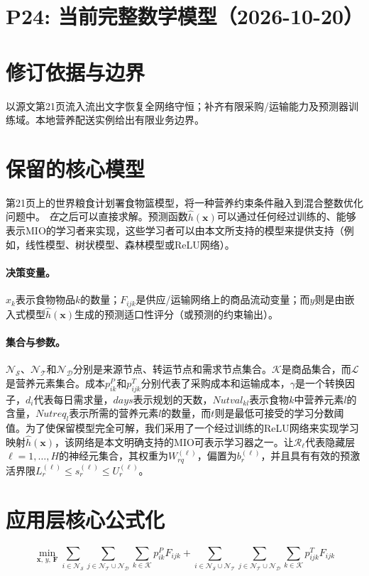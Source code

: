 \documentclass[11pt]{ctexart}
\begin{document}
\section*{P24: 当前完整数学模型（2026-10-20）}
\section*{修订依据与边界}以源文第21页流入流出文字恢复全网络守恒；补齐有限采购/运输能力及预测器训练域。本地营养配送实例给出有限业务边界。




\section*{保留的核心模型}
第21页上的世界粮食计划署食物篮模型，将一种营养约束条件融入到混合整数优化问题中。 \emph{在}之后可以直接求解。预测函数$\hat h(\boldsymbol{x})$可以通过任何经过训练的、能够表示MIO的学习者来实现，这些学习者可以由本文所支持的模型来提供支持（例如，线性模型、树状模型、森林模型或ReLU网络）。

\paragraph{决策变量。}
$x_k$表示食物物品$k$的数量；$F_{ijk}$是供应/运输网络上的商品流动变量；而$y$则是由嵌入式模型$\hat h(\boldsymbol{x})$生成的预测适口性评分（或预测的约束输出）。

\paragraph{集合与参数。}
$\mathcal N_{\mathcal S}$、$\mathcal N_{\mathcal T}$和$\mathcal N_{\mathcal D}$分别是来源节点、转运节点和需求节点集合。$\mathcal K$是商品集合，而$\mathcal L$是营养元素集合。成本$p_{ik}^P$和$p_{ijk}^T$分别代表了采购成本和运输成本，$\gamma$是一个转换因子，$d_i$代表每日需求量，$days$表示规划的天数，$Nutval_{kl}$表示食物$k$中营养元素$l$的含量，$Nutreq_l$表示所需的营养元素$l$的数量，而$t$则是最低可接受的学习分数阈值。为了使保留模型完全可解，我们采用了一个经过训练的ReLU网络来实现学习映射$\hat h(\boldsymbol{x})$，该网络是本文明确支持的MIO可表示学习器之一。让$\mathcal R_\ell$代表隐藏层$\ell=1,\dots,H$的神经元集合，其权重为$W_{rq}^{(\ell)}$，偏置为$b_r^{(\ell)}$，并且具有有效的预激活界限$L_r^{(\ell)} \le s_r^{(\ell)} \le U_r^{(\ell)}$。

\section*{应用层核心公式化}
\begin{equation}
\min_{\boldsymbol{x},\, y,\, \boldsymbol{F}}
\sum_{i \in \mathcal{N}_{\mathcal S}}
\sum_{j \in \mathcal{N}_{\mathcal T} \cup \mathcal{N}_{\mathcal D}}
\sum_{k \in \mathcal K} p_{ik}^P F_{ijk}
+
\sum_{i \in \mathcal{N}_{\mathcal S} \cup \mathcal{N}_{\mathcal T}}
\sum_{j \in \mathcal{N}_{\mathcal T} \cup \mathcal{N}_{\mathcal D}}
\sum_{k \in \mathcal K} p_{ijk}^T F_{ijk}
\tag{6a}
\end{equation}
\end{document}
